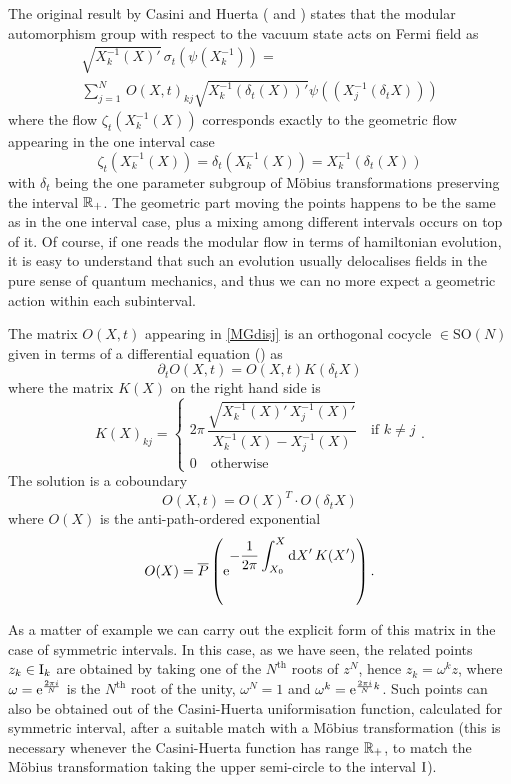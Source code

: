  \bigskip
 The original result by Casini and Huerta (\cite{CH:2009}
 and \cite{LMR:2009}) states that the modular automorphism
 group with respect to the vacuum state acts on Fermi field as
 \begin{multline}
 \label{MGdisj}
 \sqrt{{X_k^{-1}(X)}'}\,\sigma_t\left(\psi(X_k^{-1})\right)=\\
 \sum_{j=1}^N\,O(X,t)_{kj}\sqrt{{X_k^{-1}(\delta_t(X))}'}
 \psi\left((X_j^{-1}(\delta_t X))\right)
 \end{multline}
 where the flow $\zeta_t(X_k^{-1}(X))$ corresponds
 exactly to the geometric flow appearing in the one interval
 case
 \[ 
 \zeta_t(X_k^{-1}(X))=\delta_t(X_k^{-1}(X))=
 X_k^{-1}(\delta_t(X))
 \]
 with $\delta_t$ being the
 one parameter subgroup of M\"{o}bius transformations
 preserving the interval $\mathbb{R}_+$. The geometric part moving
 the points happens to be the same as in the one interval
 case, plus a mixing among different intervals occurs on 
 top of it. Of course, if one reads the modular flow in 
 terms of hamiltonian evolution, it is easy to understand
 that such an evolution usually delocalises fields in the 
 pure sense of quantum mechanics, and thus we can no more
 expect a geometric action within each subinterval.

 The matrix $O(X,t)$ appearing in \eqref{MGdisj} is an 
 orthogonal cocycle $\in \textrm{SO}(N)$ given in terms of 
 a differential equation (\cite{LMR:2009}) as 
 \begin{equation}
 \label{CHcocycle}
 \partial_tO(X,t)=O(X,t) K(\delta_t X)
 \end{equation}
 where the matrix $K(X)$ on the right hand side is
 \begin{equation}
 \label{matrix_K}
  {K(X)}_{kj}=
  \begin{cases}
  2\pi\,\dfrac{\sqrt{{X_k^{-1}(X)}'\,{X_j^{-1}(X)}'}}
  {{X_k^{-1}(X)} - {X_j^{-1}(X)}}\quad\mbox{if } k\neq j\\
  0\quad\mbox{otherwise}
 \end{cases}.
 \end{equation}
 The solution is a coboundary
 \[
 O(X,t)=O(X)^T\cdot O(\delta_t X)
 \]
 where $O(X)$ is the anti-path-ordered exponential
 \begin{equation}
 \label{anti-path}
 O(X)=\overline{P}\left(\operatorname{e}^{\displaystyle{-\frac{1}{2\pi}
 \int_{X_0}^X\textrm{d}X'\,K(X')}}\right).
 \end{equation}
 
 \bigskip
 As a matter of example we can carry out the explicit
 form of this matrix in the case of symmetric intervals.
 In this case, as we have seen, the related points
 $z_k\in\textrm{I}_k$ are obtained by taking one of the $N^{\textrm{th}}$
 roots of $z^N$, hence $z_k=\omega^k z$, where
 $\omega=\operatorname{e}^{\frac{2\pi i}{N}}$ 
 is the $N^{\textrm{th}}$ root of the unity, $\omega^N=1$
 and $\omega^k=\operatorname{e}^{\frac{2\pi i}{N}k}$. Such points can also
 be obtained out of the Casini-Huerta uniformisation function,
 calculated for symmetric interval, after a suitable
 match with a M\"obius transformation (this is necessary
 whenever the Casini-Huerta function has range $\mathbb{R}_+$, to
 match the M\"obius transformation taking the upper semi-circle
 to the interval $\textrm{I}$).
 
